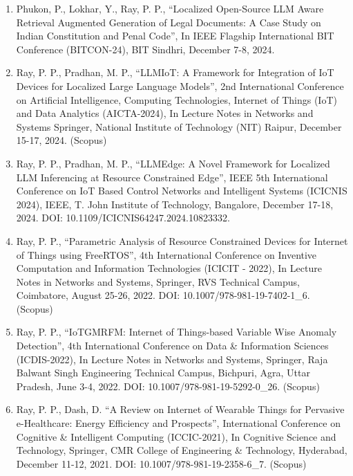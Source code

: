 \documentclass[11pt,a4paper]{moderncv}
\begin{document}
\begin{adjustwidth}{6em}{0pt}
	\begin{enumerate}
	
	\item Phukon, P., Lokhar, Y., Ray, P. P., “Localized Open-Source LLM Aware Retrieval Augmented Generation of Legal Documents: A Case Study on Indian Constitution and Penal Code”, In IEEE Flagship International BIT Conference (BITCON-24), BIT Sindhri, December 7-8, 2024.
	
	\item Ray, P. P., Pradhan, M. P., “LLMIoT: A Framework for Integration of IoT Devices for Localized Large Language Models”, 2nd International Conference on Artificial Intelligence, Computing Technologies, Internet of Things (IoT) and Data Analytics (AICTA-2024), In Lecture Notes in Networks and Systems Springer, National Institute of Technology (NIT) Raipur, December 15-17, 2024. (Scopus)
	
	\item Ray, P. P., Pradhan, M. P., “LLMEdge: A Novel Framework for Localized LLM Inferencing at Resource Constrained Edge”, IEEE 5th International Conference on IoT Based Control Networks and Intelligent Systems (ICICNIS 2024), IEEE, T. John Institute of Technology, Bangalore, December 17-18, 2024. DOI: 10.1109/ICICNIS64247.2024.10823332.
	
	\item Ray, P. P., “Parametric Analysis of Resource Constrained Devices for Internet of Things using FreeRTOS”, 4th International Conference on Inventive Computation and Information Technologies (ICICIT - 2022), In Lecture Notes in Networks and Systems, Springer, RVS Technical Campus, Coimbatore, August 25-26, 2022. DOI: 10.1007/978-981-19-7402-1\_6. (Scopus)
	
	\item Ray, P. P., “IoTGMRFM: Internet of Things-based Variable Wise Anomaly Detection”, 4th International Conference on Data \& Information Sciences (ICDIS-2022), In Lecture Notes in Networks and Systems, Springer, Raja Balwant Singh Engineering Technical Campus, Bichpuri, Agra, Uttar Pradesh, June 3-4, 2022. DOI: 10.1007/978-981-19-5292-0\_26. (Scopus)
	
	\item Ray, P. P., Dash, D. “A Review on Internet of Wearable Things for Pervasive e-Healthcare: Energy Efficiency and Prospects”, International Conference on Cognitive \& Intelligent Computing (ICCIC-2021), In Cognitive Science and Technology, Springer, CMR College of Engineering \& Technology, Hyderabad, December 11-12, 2021. DOI: 10.1007/978-981-19-2358-6\_7. (Scopus)
	

\end{enumerate}
\end{adjustwidth}
\end{document}
